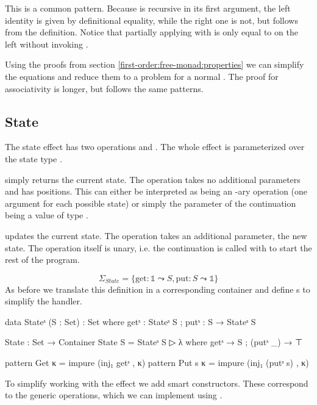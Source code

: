 This is a common pattern.
Because \AgdaFunction{++} is recursive in its first argument, the left
identity is given by definitional equality, while the right one is not, but
follows from the definition.
Notice that partially applying \AgdaFunction{++} with
\AgdaInductiveConstructor{[]} is only equal to  on the left
without invoking .

Using the proofs from section \ref{first-order:free-monad:properties} we
can simplify the equations and reduce them to a problem for a normal
.
The proof for associativity is longer, but follows the same patterns.


\subsection{State}

The state effect has two operations  and .
The whole effect is parameterized over the state type .

 simply returns the current state.
The operation takes no additional parameters and has  positions.
This can either be interpreted as  being an
-ary operation (one argument for each possible state) or
simply the parameter of the continuation being a value of type .

 updates the current state.
The operation takes an additional parameter, the new state.
The operation itself is unary, i.e. the continuation is called with
 to start the rest of the program.

$$
\Sigma_{State} = \{ \mathrm{get} : \mathbb{1} \leadsto S, \mathrm{put} :
S \leadsto \mathbb{1} \}
$$
As before we translate this definition in a corresponding container and
define s to simplify the handler.

\begin{code}
data Stateˢ (S : Set) : Set where getˢ : Stateˢ S ; putˢ : S → Stateˢ S

State : Set → Container
State S = Stateˢ S ▷ λ where getˢ → S ; (putˢ _) → ⊤

pattern Get κ    = impure (inj₁ getˢ      , κ)
pattern Put s κ  = impure (inj₁ (putˢ s)  , κ)
\end{code}
To simplify working with the  effect we add smart
constructors.
These correspond to the generic operations, which we can implement using
.

